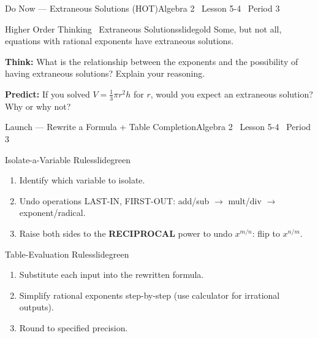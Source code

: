 \documentclass[aspectratio=169, 11pt]{beamer}
\begin{document}

\begin{frame}{Do Now --- Extraneous Solutions (HOT)}{Algebra 2 \textperiodcentered\ Lesson 5-4 \textperiodcentered\ Period 3}
\vspace{0.2cm}
\begin{projcard}{Higher Order Thinking \textperiodcentered\ Extraneous Solutions}{slidegold}
\small
Some, but not all, equations with rational exponents have extraneous solutions.

\vspace{0.2cm}
\textbf{Think:} What is the relationship between the exponents and the possibility
of having extraneous solutions? Explain your reasoning.

\vspace{0.2cm}
\textcolor{slidegold}{\textbf{Predict:}} If you solved \(V = \tfrac{1}{3}\pi r^2 h\) for \(r\),
would you expect an extraneous solution? Why or why not?
\end{projcard}
\end{frame}

\begin{frame}{Launch --- Rewrite a Formula + Table Completion}{Algebra 2 \textperiodcentered\ Lesson 5-4 \textperiodcentered\ Period 3}
\vspace{0.15cm}
\begin{projcard}{Isolate-a-Variable Rules}{slidegreen}
\small
\begin{enumerate}
  \setlength{\itemsep}{1pt}
  \item Identify which variable to isolate.
  \item Undo operations LAST-IN, FIRST-OUT: add/sub \(\rightarrow\) mult/div \(\rightarrow\) exponent/radical.
  \item Raise both sides to the \textbf{RECIPROCAL} power to undo \(x^{m/n}\): flip to \(x^{n/m}\).
\end{enumerate}
\end{projcard}
\vspace{-0.1cm}
\begin{projcard}{Table-Evaluation Rules}{slidegreen}
\small
\begin{enumerate}
  \setlength{\itemsep}{1pt}
  \item Substitute each input into the rewritten formula.
  \item Simplify rational exponents step-by-step (use calculator for irrational outputs).
  \item Round to specified precision.
\end{enumerate}
\end{projcard}
\end{frame}
\end{document}

